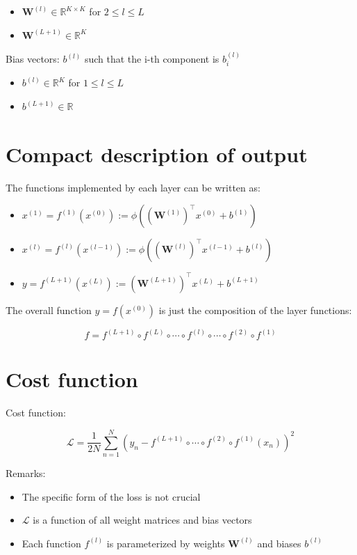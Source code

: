 \documentclass[10pt]{article}
\begin{document}
\begin{itemize}
  \item $\mathbf{W}^{(l)} \in \mathbb{R}^{K \times K}$ for $2 \leq l \leq L$
  \item $\mathbf{W}^{(L+1)} \in \mathbb{R}^{K}$
\end{itemize}

Bias vectors: $b^{(l)}$ such that the i-th component is $b_{i}^{(l)}$

\begin{itemize}
  \item $b^{(l)} \in \mathbb{R}^{K}$ for $1 \leq l \leq L$
  \item $b^{(L+1)} \in \mathbb{R}$
\end{itemize}

\section*{Compact description of output}
The functions implemented by each layer can be written as:

\begin{itemize}
  \item $x^{(1)}=f^{(1)}\left(x^{(0)}\right):=\phi\left(\left(\mathbf{W}^{(1)}\right)^{\top} x^{(0)}+b^{(1)}\right)$
  \item $x^{(l)}=f^{(l)}\left(x^{(l-1)}\right):=\phi\left(\left(\mathbf{W}^{(l)}\right)^{\top} x^{(l-1)}+b^{(l)}\right)$
  \item $y=f^{(L+1)}\left(x^{(L)}\right):=\left(\mathbf{W}^{(L+1)}\right)^{\top} x^{(L)}+b^{(L+1)}$
\end{itemize}

The overall function $y=f\left(x^{(0)}\right)$ is just the composition of the layer functions:

$$
f=f^{(L+1)} \circ f^{(L)} \circ \cdots \circ f^{(l)} \circ \cdots \circ f^{(2)} \circ f^{(1)}
$$

\section*{Cost function}
Cost function:

$$
\mathscr{L}=\frac{1}{2 N} \sum_{n=1}^{N}\left(y_{n}-f^{(L+1)} \circ \cdots \circ f^{(2)} \circ f^{(1)}\left(x_{n}\right)\right)^{2}
$$

Remarks:

\begin{itemize}
  \item The specific form of the loss is not crucial
  \item $\mathscr{L}$ is a function of all weight matrices and bias vectors
  \item Each function $f^{(l)}$ is parameterized by weights $\mathbf{W}^{(l)}$ and biases $b^{(l)}$
\end{itemize}
\end{document}

